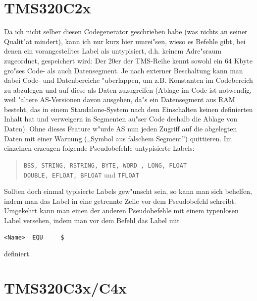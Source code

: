 \documentclass[12pt,a4paper,twoside]{report}
\newcommand{\asname}{AS}
\begin{document}

\section{TMS320C2x}

Da ich nicht selber diesen Codegenerator geschrieben habe (was nichts an
seiner Qualit"at mindert), kann ich nur kurz hier umrei"sen, wieso es
Befehle gibt, bei denen ein vorangestelltes Label als untypisiert, d.h.
keinem Adre"sraum zugeordnet, gespeichert wird:  Der 20er der TMS-Reihe
kennt sowohl ein 64 Kbyte gro"ses Code- als auch Datensegment.  Je nach
externer Beschaltung kann man dabei Code- und Datenbereiche "uberlappen,
um z.B. Konstanten im Codebereich zu abzulegen und auf diese als Daten
zuzugreifen (Ablage im Code ist notwendig, weil "altere \asname{}-Versionen davon
ausgehen, da"s ein Datensegment aus RAM besteht, das in einem
Standalone-System nach dem Einschalten keinen definierten Inhalt hat und
verweigern in Segmenten au"ser Code deshalb die Ablage von Daten).  Ohne
dieses Feature w"urde \asname{} nun jeden Zugriff auf die abgelegten Daten mit
einer Warnung (,,Symbol aus falschem Segment'') quittieren.  Im einzelnen
erzeugen folgende Pseudobefehle untypisierte Labels:
\begin{quote}
  {\tt BSS, STRING, RSTRING, BYTE, WORD , LONG, FLOAT \\
  DOUBLE, EFLOAT, BFLOAT} und {\tt TFLOAT}
\end{quote}
Sollten doch einmal typisierte Labels gew"unscht sein, so kann man sich
behelfen, indem man das Label in eine getrennte Zeile vor dem Pseudobefehl
schreibt.  Umgekehrt kann man einen der anderen Pseudobefehle mit einem
typenlosen Label versehen, indem man vor dem Befehl das Label mit
\begin{verbatim}
<Name>  EQU     $
\end{verbatim}
definiert.


\section{TMS320C3x/C4x}
\end{document}
